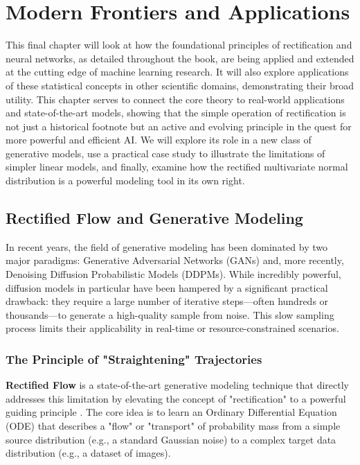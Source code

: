 \ifdefined\ispartofbook
\else
  
  
\fi

\chapter{Modern Frontiers and Applications}
\label{chap:frontiers}

This final chapter will look at how the foundational principles of rectification and neural networks, as detailed throughout the book, are being applied and extended at the cutting edge of machine learning research. It will also explore applications of these statistical concepts in other scientific domains, demonstrating their broad utility. This chapter serves to connect the core theory to real-world applications and state-of-the-art models, showing that the simple operation of rectification is not just a historical footnote but an active and evolving principle in the quest for more powerful and efficient AI. We will explore its role in a new class of generative models, use a practical case study to illustrate the limitations of simpler linear models, and finally, examine how the rectified multivariate normal distribution is a powerful modeling tool in its own right.

\section{Rectified Flow and Generative Modeling}
\label{sec:rectified_flow}

In recent years, the field of generative modeling has been dominated by two major paradigms: Generative Adversarial Networks (GANs) and, more recently, Denoising Diffusion Probabilistic Models (DDPMs). While incredibly powerful, diffusion models in particular have been hampered by a significant practical drawback: they require a large number of iterative steps—often hundreds or thousands—to generate a high-quality sample from noise. This slow sampling process limits their applicability in real-time or resource-constrained scenarios.

\subsection{The Principle of "Straightening" Trajectories}
\textbf{Rectified Flow} is a state-of-the-art generative modeling technique that directly addresses this limitation by elevating the concept of "rectification" to a powerful guiding principle \cite{Liu2022RectifiedFlow}. The core idea is to learn an Ordinary Differential Equation (ODE) that describes a "flow" or "transport" of probability mass from a simple source distribution (e.g., a standard Gaussian noise) to a complex target data distribution (e.g., a dataset of images).

